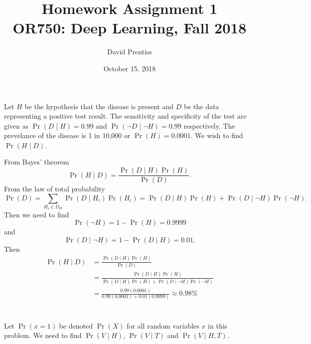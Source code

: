 \documentclass[letterpaper]{amsart}
\begin{document}
\title[Homework 1]{Homework Assignment 1 \\ OR750: Deep Learning, Fall 2018}
\author{David Prentiss}
\date{October 15, 2018}
\maketitle

\section{}
Let $H$ be the hypothesis that the disease is present and $D$ be the data
representing a positive test result. The sensitivity and specificity of the test
are given as
$\Pr(D\mid H) = 0.99$
and
$\Pr(\neg D\mid\neg H) = 0.99$
respectively.
The prevelance of the disease is 1 in 10,000 or
$\Pr(H) = 0.0001$.
We wish to find
$\Pr(H\mid D)$.

From Bayes' theorem
\begin{equation}
  \Pr(H\mid D) = \frac{\Pr(D\mid H)\Pr(H)}{\Pr(D)}.
\end{equation}
From the law of total probability
\begin{equation}
  \Pr(D) = \sum_{H_i\in\Omega_H}\Pr(D\mid H_i)\Pr(H_i)
  = \Pr(D\mid H)\Pr(H) +\Pr(D\mid\neg H)\Pr(\neg H).
\end{equation}
Then we need to find
\begin{equation}
  \Pr(\neg H) = 1 - \Pr(H) = 0.9999
\end{equation}
and
\begin{equation}
  \Pr(D\mid\neg H) = 1 - \Pr(D\mid H) = 0.01.
\end{equation}
Then
\begin{align}
  \Pr(H\mid D)
  &= \frac{\Pr(D\mid H)\Pr(H)}{\Pr(D)} 
  \\
  &= \frac{\Pr(D\mid H)\Pr(H)}{\Pr(D\mid H)\Pr(H) +\Pr(D\mid\neg H)\Pr(\neg H)}
  \\
  &= \frac{0.99(0.0001)}{0.99(0.0001) + 0.01(0.9999)} \approx 0.98\%
\end{align}

\section{}
Let
$\Pr(x = 1)$
be denoted
$\Pr(X)$
for all random variables $x$ in this problem. We need to find
$\Pr(V\mid H)$,
$\Pr(V\mid T)$
and
$\Pr(V\mid H, T)$.
\end{document}
